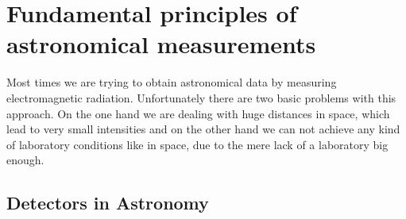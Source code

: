 \chapter{Fundamental principles of astronomical measurements}
Most times we are trying to obtain astronomical data by measuring electromagnetic radiation. 
Unfortunately there are two basic problems with this approach. On the one hand we are dealing with huge distances in space, which lead to very small intensities and on the other hand we can not achieve any kind of laboratory conditions like in space, due to the mere lack of a laboratory big enough.

\section{Detectors in Astronomy}

